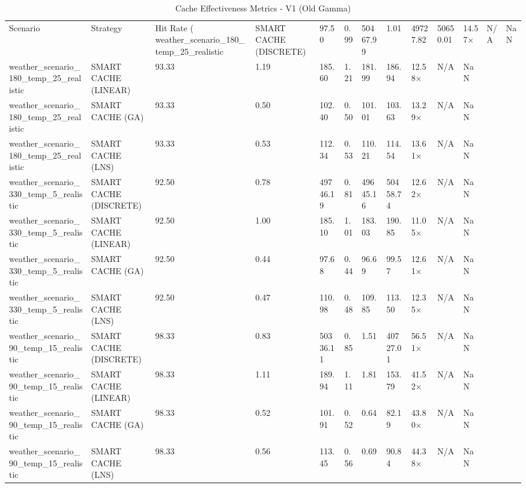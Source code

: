 \begin{table}
\caption{Cache Effectiveness Metrics - V1 (Old Gamma)}
\label{tab:cache_metrics}
\begin{tabular}{lllllllllll}
\toprule
Scenario & Strategy & Hit Rate (%
\midrule
weather_scenario_180_temp_25_realistic & SMART CACHE (DISCRETE) & 97.50 & 0.99 & 50467.99 & 1.01 & 49727.82 & 50650.01 & 14.57× & N/A & NaN \\
weather_scenario_180_temp_25_realistic & SMART CACHE (LINEAR) & 93.33 & 1.19 & 185.60 & 1.21 & 181.99 & 186.94 & 12.58× & N/A & NaN \\
weather_scenario_180_temp_25_realistic & SMART CACHE (GA) & 93.33 & 0.50 & 102.40 & 0.50 & 101.01 & 103.63 & 13.29× & N/A & NaN \\
weather_scenario_180_temp_25_realistic & SMART CACHE (LNS) & 93.33 & 0.53 & 112.34 & 0.53 & 110.21 & 114.54 & 13.61× & N/A & NaN \\
weather_scenario_330_temp_5_realistic & SMART CACHE (DISCRETE) & 92.50 & 0.78 & 49746.19 & 0.81 & 49645.16 & 50458.74 & 12.62× & N/A & NaN \\
weather_scenario_330_temp_5_realistic & SMART CACHE (LINEAR) & 92.50 & 1.00 & 185.10 & 1.01 & 183.03 & 190.85 & 11.05× & N/A & NaN \\
weather_scenario_330_temp_5_realistic & SMART CACHE (GA) & 92.50 & 0.44 & 97.68 & 0.44 & 96.69 & 99.57 & 12.61× & N/A & NaN \\
weather_scenario_330_temp_5_realistic & SMART CACHE (LNS) & 92.50 & 0.47 & 110.98 & 0.48 & 109.85 & 113.50 & 12.35× & N/A & NaN \\
weather_scenario_90_temp_15_realistic & SMART CACHE (DISCRETE) & 98.33 & 0.83 & 50336.11 & 0.85 & 1.51 & 40727.01 & 56.51× & N/A & NaN \\
weather_scenario_90_temp_15_realistic & SMART CACHE (LINEAR) & 98.33 & 1.11 & 189.94 & 1.11 & 1.81 & 153.79 & 41.52× & N/A & NaN \\
weather_scenario_90_temp_15_realistic & SMART CACHE (GA) & 98.33 & 0.52 & 101.91 & 0.52 & 0.64 & 82.19 & 43.80× & N/A & NaN \\
weather_scenario_90_temp_15_realistic & SMART CACHE (LNS) & 98.33 & 0.56 & 113.45 & 0.56 & 0.69 & 90.84 & 44.38× & N/A & NaN \\
\bottomrule
\end{tabular}
\end{table}
